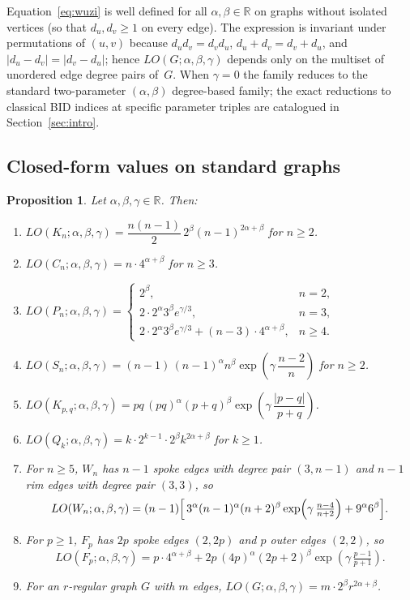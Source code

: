 \documentclass[a5paper, 10pt]{article}
\theoremstyle{plain}
\newtheorem{proposition}[theorem]{Proposition}
\theoremstyle{remark}
\theoremstyle{definition}
\newcommand{\Wuzi}{LO(G;\alpha,\beta,\gamma)}
\begin{document}
Equation~\eqref{eq:wuzi} is well defined for all
$\alpha, \beta \in \mathbb{R}$ on graphs without isolated vertices
(so that $d_u, d_v \ge 1$ on every edge). The expression is
invariant under permutations of $(u, v)$ because
$d_u d_v = d_v d_u$, $d_u + d_v = d_v + d_u$, and
$|d_u - d_v| = |d_v - d_u|$; hence $\Wuzi$ depends only on the
multiset of unordered edge degree pairs of~$G$. When $\gamma = 0$
the family reduces to the standard two-parameter
$(\alpha, \beta)$ degree-based family; the exact reductions to
classical BID indices at specific parameter triples are
catalogued in Section~\ref{sec:intro}.
\subsection{Closed-form values on standard graphs}\label{sec:closedforms}

  \begin{proposition}\label{prop:closedforms}
  Let $\alpha, \beta, \gamma \in \mathbb{R}$. Then:
  \begin{enumerate}
  \item  $LO(K_n; \alpha, \beta, \gamma) =
    \dfrac{n(n-1)}{2}\,2^{\beta}(n - 1)^{2\alpha + \beta}$ for $n \ge 2$.
  \item  $LO(C_n; \alpha, \beta, \gamma) = n \cdot 4^{\alpha +
  \beta}$
    for $n \ge 3$.
  \item
    $LO(P_n; \alpha, \beta, \gamma) =
    \begin{cases}
      2^{\beta}, & n = 2,\\[2pt]
      2 \cdot 2^{\alpha} 3^{\beta} e^{\gamma/3}, & n = 3,\\[2pt]
      2 \cdot 2^{\alpha} 3^{\beta} e^{\gamma/3} + (n - 3) \cdot 4^{\alpha +
  \beta},
         & n \ge 4.
    \end{cases}$
  \item  $LO(S_n; \alpha, \beta, \gamma) =
    (n - 1)\,(n - 1)^{\alpha} n^{\beta} \exp\!\left(\gamma\,\dfrac{n -
  2}{n}\right)$
    for $n \ge 2$.
  \item  $LO(K_{p,q}; \alpha, \beta, \gamma) =
    pq\,(pq)^{\alpha}(p + q)^{\beta}\exp\!\left(\gamma\,\dfrac{|p - q|}{p +
  q}\right)$.
  \item  $LO(Q_k; \alpha, \beta, \gamma) =
    k \cdot 2^{k - 1} \cdot 2^{\beta} k^{2\alpha + \beta}$ for $k \ge 1$.
  \item  For $n \ge 5$, $W_n$ has $n - 1$ spoke edges with
    degree pair $(3, n - 1)$ and $n - 1$ rim edges with degree pair
    $(3, 3)$, so
    \[
    LO(W_n; \alpha, \beta, \gamma)
    = (n - 1)\Bigl[\,3^{\alpha} (n - 1)^{\alpha}(n + 2)^{\beta}
         \exp\!\left(\gamma\,\tfrac{n - 4}{n + 2}\right)
       + 9^{\alpha} 6^{\beta}\Bigr].
    \]
  \item  For $p \ge 1$, $F_p$ has $2p$ spoke edges
    $(2, 2p)$ and $p$ outer edges $(2, 2)$, so
    \[
    LO(F_p; \alpha, \beta, \gamma)
    = p \cdot 4^{\alpha + \beta}
     + 2p\,(4p)^{\alpha}(2p + 2)^{\beta}
         \exp\!\left(\gamma\,\tfrac{p - 1}{p + 1}\right).
    \]
  \item  For an $r$-regular graph $G$ with $m$ edges,
    $\Wuzi = m \cdot 2^{\beta} r^{2\alpha + \beta}$.
  \end{enumerate}
  \end{proposition}
\end{document}
